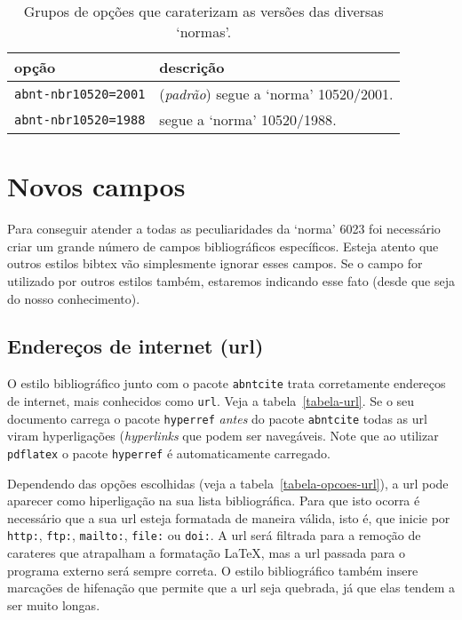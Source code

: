 \documentclass[espacosimples]{abnt}
\begin{document}
\begin{table}[htbp]
\begin{center}
\begin{tabular}{lp{9cm}}\hline\hline
opção & descrição \\ \hline
{\tt abnt-nbr10520=2001} & (\emph{padrão}) segue a `norma' 10520/2001\cite{NBR10520:2001}.\\
{\tt abnt-nbr10520=1988} & segue a `norma' 10520/1988\cite{NBR10520:1988}.\\
\hline\hline
\end{tabular}
\end{center}
\caption[Versão das `normas' a ser usada]{
Grupos de opções que caraterizam as versões das diversas `normas'.}
\label{tabela-versao-normas}
\end{table}


\clearpage
\chapter{Novos campos}

Para conseguir atender a todas as peculiaridades da `norma' 6023\cite{NBR6023:2000}
foi necessário criar um grande número de campos bibliográficos específicos.
Esteja atento que outros estilos bibtex vão simplesmente ignorar esses campos.
Se o campo for utilizado por outros estilos também, estaremos indicando esse
fato (desde que seja do nosso conhecimento).

\section{Endereços de internet (url)}\label{sec-url}

O estilo bibliográfico junto com o pacote {\tt abntcite} trata corretamente
endereços de internet, mais conhecidos como {\tt url}. Veja a tabela~\ref{tabela-url}.
Se o seu documento carrega o pacote {\tt hyperref} \emph{antes} do
pacote {\tt abntcite} todas as url viram hyperligações (\emph{hyperlinks}
que podem ser navegáveis. Note que ao utilizar {\tt pdflatex} o
pacote {\tt hyperref} é automaticamente carregado.

Dependendo das opções escolhidas (veja a tabela~\ref{tabela-opcoes-url}),
a url pode aparecer como hiperligação na
sua lista bibliográfica. Para que isto ocorra é necessário que a sua url
esteja formatada de maneira válida, isto é, que inicie por
{\tt http:}, {\tt ftp:}, {\tt mailto:}, {\tt file:} ou {\tt doi:}.
A url será filtrada para a remoção de carateres que atrapalham a formatação
\LaTeX, mas a url passada para o programa externo será sempre correta.
O estilo bibliográfico também insere marcações de hifenação que permite que
a url seja quebrada, já que elas tendem a ser muito longas.
\end{document}
